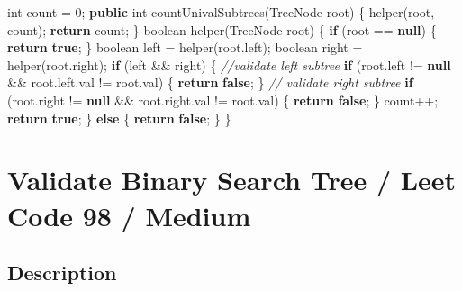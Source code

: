 \documentclass[]{book}
\newenvironment{Shaded}{\begin{snugshade}}{\end{snugshade}}
\newcommand{\BuiltInTok}[1]{#1}
\newcommand{\CommentTok}[1]{\textcolor[rgb]{0.56,0.35,0.01}{\textit{#1}}}
\newcommand{\DataTypeTok}[1]{\textcolor[rgb]{0.13,0.29,0.53}{#1}}
\newcommand{\DecValTok}[1]{\textcolor[rgb]{0.00,0.00,0.81}{#1}}
\newcommand{\FunctionTok}[1]{\textcolor[rgb]{0.00,0.00,0.00}{#1}}
\newcommand{\KeywordTok}[1]{\textcolor[rgb]{0.13,0.29,0.53}{\textbf{#1}}}
\newcommand{\NormalTok}[1]{#1}
\begin{document}
\begin{Shaded}
\begin{Highlighting}[]
\DataTypeTok{int}\NormalTok{ count = }\DecValTok{0}\NormalTok{;}
\KeywordTok{public} \DataTypeTok{int} \FunctionTok{countUnivalSubtrees}\NormalTok{(}\BuiltInTok{TreeNode}\NormalTok{ root) \{}
    \FunctionTok{helper}\NormalTok{(root, count);}
    \KeywordTok{return}\NormalTok{ count;}
\NormalTok{\}}
\DataTypeTok{boolean} \FunctionTok{helper}\NormalTok{(}\BuiltInTok{TreeNode}\NormalTok{ root) \{}
    \KeywordTok{if}\NormalTok{ (root == }\KeywordTok{null}\NormalTok{) \{}
        \KeywordTok{return} \KeywordTok{true}\NormalTok{;}
\NormalTok{    \}}
    \DataTypeTok{boolean}\NormalTok{ left = }\FunctionTok{helper}\NormalTok{(root.}\FunctionTok{left}\NormalTok{);}
    \DataTypeTok{boolean}\NormalTok{ right = }\FunctionTok{helper}\NormalTok{(root.}\FunctionTok{right}\NormalTok{);}
    \KeywordTok{if}\NormalTok{ (left && right) \{}
        \CommentTok{//validate left subtree}
        \KeywordTok{if}\NormalTok{ (root.}\FunctionTok{left}\NormalTok{ != }\KeywordTok{null}\NormalTok{ && root.}\FunctionTok{left}\NormalTok{.}\FunctionTok{val}\NormalTok{ != root.}\FunctionTok{val}\NormalTok{) \{}
            \KeywordTok{return} \KeywordTok{false}\NormalTok{;}
\NormalTok{        \}}
        \CommentTok{// validate right subtree}
        \KeywordTok{if}\NormalTok{ (root.}\FunctionTok{right}\NormalTok{ != }\KeywordTok{null}\NormalTok{ && root.}\FunctionTok{right}\NormalTok{.}\FunctionTok{val}\NormalTok{ != root.}\FunctionTok{val}\NormalTok{) \{}
            \KeywordTok{return} \KeywordTok{false}\NormalTok{;}
\NormalTok{        \}}
\NormalTok{        count++;}
        \KeywordTok{return} \KeywordTok{true}\NormalTok{;}
\NormalTok{    \} }\KeywordTok{else}\NormalTok{ \{}
        \KeywordTok{return} \KeywordTok{false}\NormalTok{;}
\NormalTok{    \}}
\NormalTok{\}}
\end{Highlighting}
\end{Shaded}

\hypertarget{validate-binary-search-tree-leet-code-98-medium}{%
\section{Validate Binary Search Tree / Leet Code 98 / Medium}\label{validate-binary-search-tree-leet-code-98-medium}}

\hypertarget{description-68}{%
\subsection{Description}\label{description-68}}
\end{document}
